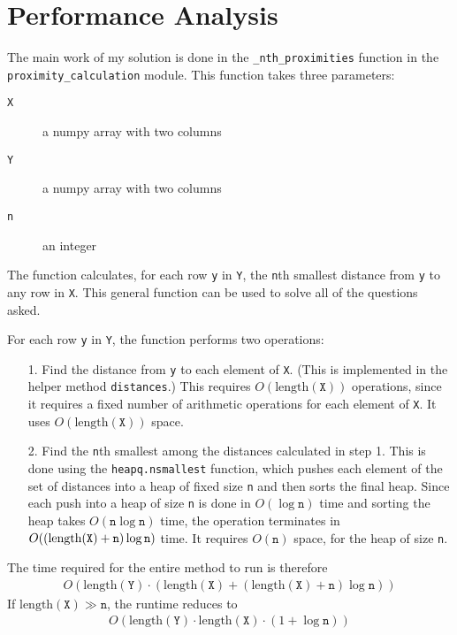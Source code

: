 \documentclass{amsart}
\theoremstyle{definition}
\theoremstyle{definition}
\begin{document}
\section{Performance Analysis}
The main work of my solution is done in the \texttt{\_nth\_proximities} function in the \texttt{proximity\_calculation} module.  This function takes three parameters:
\begin{description}
\item[\texttt{X}] a numpy array with two columns
\item[\texttt{Y}] a numpy array with two columns
\item[\texttt{n}] an integer
\end{description}
The function calculates, for each row \texttt{y} in \texttt{Y}, the \texttt{n}th smallest distance from \texttt{y} to any row in \texttt{X}.  This general function can be used to solve all of the questions asked.

For each row \texttt{y} in \texttt{Y}, the function performs two operations:
\begin{itemize}
\item[1.] Find the distance from \texttt{y} to each element of \texttt{X}.  (This is implemented in the helper method \texttt{distances}.)  This requires $O(\mbox{length}(\texttt{X}))$ operations, since it requires a fixed number of arithmetic operations for each element of \texttt{X}.  It uses $O(\mbox{length}(\texttt{X}))$ space.
\item[2.] Find the \texttt{n}th smallest among the distances calculated in step 1.  This is done using the \texttt{heapq.nsmallest} function, which pushes each element of the set of distances into a heap of fixed size \texttt{n} and then sorts the final heap.  Since each push into a heap of size \texttt{n} is done in $O(\log \texttt{n})$ time and sorting the heap takes $O(\texttt{n}\log \texttt{n})$ time, the operation terminates in $O((\mbox{length(\texttt{X})}+\texttt{n})\log \texttt{n})$ time.  It requires $O(\texttt{n})$ space, for the heap of size \texttt{n}.
\end{itemize}
The time required for the entire method to run is therefore
\begin{align*}
  O(\mbox{length}(\texttt{Y})\cdot (\mbox{length}(\texttt{X}) + (\mbox{length}(\texttt{X})+\texttt{n})\log \texttt{n}))
\end{align*}
If $\mbox{length}(\texttt{X}) \gg \texttt{n}$, the runtime reduces to
\begin{align}
  O(\mbox{length}(\texttt{Y})\cdot \mbox{length}(\texttt{X}) \cdot (1+\log \texttt{n}))\label{performance}
\end{align}
\end{document}
